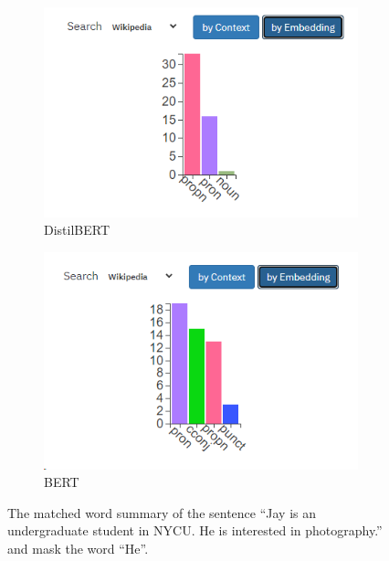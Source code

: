 \documentclass{article}[12pt]
\begin{document}
\begin{figure}[htbp]
	\centering
	\begin{subfigure}[b]{0.45\textwidth}
		\centering
		\includegraphics[width=\textwidth]{figure/exbert-distil4}
		\caption{DistilBERT}
		\label{fig:exbert-distilbert-embedding}
	\end{subfigure}
	\hfill
	\begin{subfigure}[b]{0.45\textwidth}
		\centering
		\includegraphics[width=\textwidth]{figure/exbert-distil5}
		\caption{BERT}
		\label{fig:exbert-bert-embedding}
	\end{subfigure}
	\caption{The matched word summary of the sentence ``Jay is an undergraduate student in NYCU. He is interested in photography.'' and mask the word ``He''.}
\end{figure}
\end{document}
